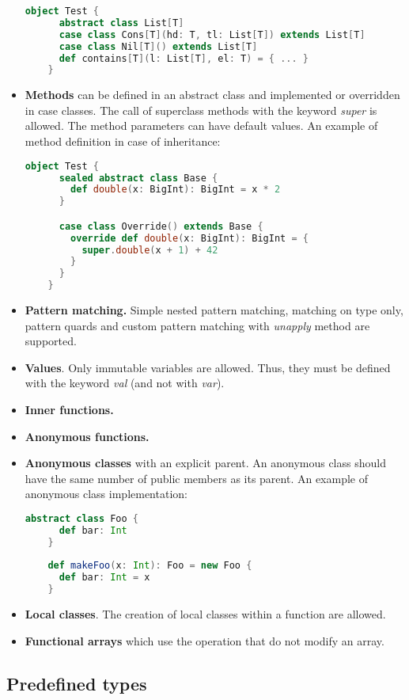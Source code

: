 \begin{itemize}
  \begin{lstlisting}[language=Scala]
    object Test {
      abstract class List[T]
      case class Cons[T](hd: T, tl: List[T]) extends List[T]
      case class Nil[T]() extends List[T]
      def contains[T](l: List[T], el: T) = { ... }
    }
  \end{lstlisting}
  \item \textbf{Methods} can be defined in an abstract class and implemented or overridden in case classes. 
  The call of superclass methods with the keyword \textit{super} is allowed. 
  The method parameters can have default values. 
  An example of method definition in case of inheritance:
  \begin{lstlisting}[language=Scala]
    object Test {
      sealed abstract class Base {
        def double(x: BigInt): BigInt = x * 2
      }

      case class Override() extends Base {
        override def double(x: BigInt): BigInt = {
          super.double(x + 1) + 42
        }
      }
    }
  \end{lstlisting}
  \item \textbf{Pattern matching.} 
  Simple nested pattern matching, matching on type only, pattern quards and custom pattern matching with \textit{unapply} method are supported.
  \item \textbf{Values}. 
  Only immutable variables are allowed. Thus, they must be defined with the keyword \textit{val} (and not with \textit{var}).
  \item \textbf{Inner functions.}
  \item \textbf{Anonymous functions.}
  \item \textbf{Anonymous classes} with an explicit parent. 
  An anonymous class should have the same number of public members as its parent.
  An example of anonymous class implementation:
  \begin{lstlisting}[language=Scala]
    abstract class Foo {
      def bar: Int
    }
    
    def makeFoo(x: Int): Foo = new Foo {
      def bar: Int = x
    }
  \end{lstlisting}
  \item \textbf{Local classes}. 
  The creation of local classes within a function are allowed. \cite{Stainless:pure_scala}
  \item \textbf{Functional arrays} which use the operation that do not modify an array.
\end{itemize}

\subsection{Predefined types}


